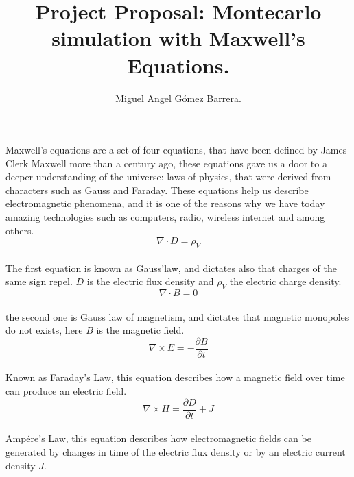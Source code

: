 \documentclass{article}
\title{Project Proposal: Montecarlo simulation with Maxwell's Equations.}
\author{Miguel Angel Gómez Barrera.}
\begin{document}
	\maketitle
\paragraph{}Maxwell's equations are a set of four equations, that have been defined by James Clerk Maxwell more than a century ago, these equations gave us a door to a deeper understanding of the universe: laws of physics, that were derived from characters such as Gauss and Faraday. These equations help us describe electromagnetic phenomena, and it is one of the reasons why we have today amazing technologies such as computers, radio, wireless internet and among others.
\begin{equation}
	\nabla \cdot D = \rho_V
\end{equation}
\paragraph{}The first equation is known as Gauss'law, and dictates also that charges of the same sign repel. $D$ is the electric flux density and $\rho_V$ the electric charge density.
\begin{equation}
	\nabla \cdot B = 0
\end{equation}
\paragraph{} the second one is Gauss law of magnetism, and dictates that magnetic monopoles do not exists, here $B$ is the magnetic field.
\begin{equation}
	\nabla \times E = -\frac{\partial B}{\partial t}
\end{equation}
\paragraph{}Known as Faraday's Law, this equation describes how a magnetic field over time can produce an electric field.
\begin{equation}
	\nabla \times H = \frac{\partial D}{\partial t} + J
\end{equation}
\paragraph{} Ampére's Law, this equation describes how electromagnetic fields can be generated by changes in time of the electric flux density or by an electric current density $J$.
\end{document}
